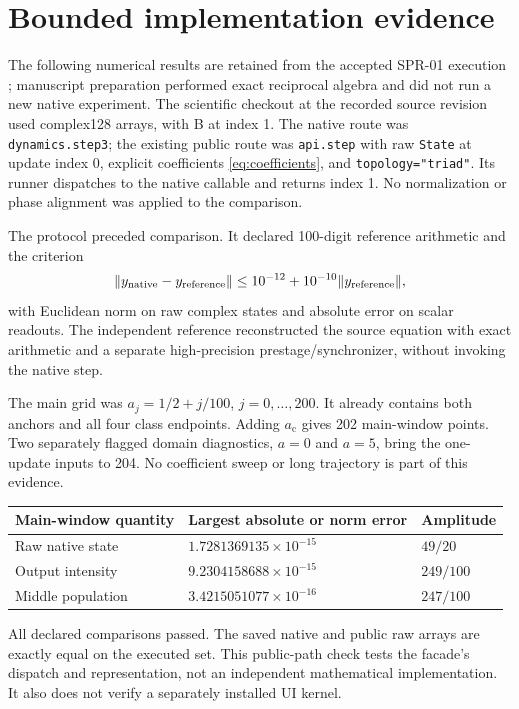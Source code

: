 \documentclass[11pt,a4paper]{article}
\newcommand{\ac}{a_{\mathrm c}}
\begin{document}
\clearpage
\section{Bounded implementation evidence}\label{sec:evidence}
The following numerical results are retained from the accepted SPR-01 execution \cite{spr01}; manuscript preparation performed exact reciprocal algebra and did not run a new native experiment. The scientific checkout at the recorded source revision used complex128 arrays, with B at index 1. The native route was \texttt{dynamics.step3}; the existing public route was \texttt{api.step} with raw \texttt{State} at update index 0, explicit coefficients \eqref{eq:coefficients}, and \texttt{topology="triad"}. Its runner dispatches to the native callable and returns index 1. No normalization or phase alignment was applied to the comparison.

The protocol preceded comparison. It declared 100-digit reference arithmetic and the criterion
\begin{equation}
\|y_{\rm native}-y_{\rm reference}\|\le10^{-12}+10^{-10}\|y_{\rm reference}\|,\label{eq:tolerance}
\end{equation}
with Euclidean norm on raw complex states and absolute error on scalar readouts. The independent reference reconstructed the source equation with exact arithmetic and a separate high-precision prestage/synchronizer, without invoking the native step.

The main grid was $a_j=1/2+j/100$, $j=0,\ldots,200$. It already contains both anchors and all four class endpoints. Adding $\ac$ gives 202 main-window points. Two separately flagged domain diagnostics, $a=0$ and $a=5$, bring the one-update inputs to 204. No coefficient sweep or long trajectory is part of this evidence.

\begin{center}
\begin{tabular}{@{}lll@{}}
\toprule
Main-window quantity & Largest absolute or norm error & Amplitude\\\midrule
Raw native state & $1.7281369135\times10^{-15}$ & $49/20$\\
Output intensity & $9.2304158688\times10^{-15}$ & $249/100$\\
Middle population & $3.4215051077\times10^{-16}$ & $247/100$\\\bottomrule
\end{tabular}
\end{center}
All declared comparisons passed. The saved native and public raw arrays are exactly equal on the executed set. This public-path check tests the facade's dispatch and representation, not an independent mathematical implementation. It also does not verify a separately installed UI kernel.
\end{document}
